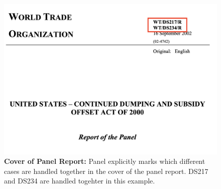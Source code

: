 \begin{figure}[h]
    \centering
    \includegraphics[scale=0.35]{Data/pngs/linked_cases.png}
    \caption{\textbf{Cover of Panel Report:}
        Panel explicitly marks which different cases are handled together in the cover of the panel report. DS217 and DS234 are handled togehter in this example.
        }
    \label{fig:linked-cases}
\end{figure}



